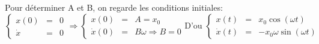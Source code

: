 	Pour déterminer A et B, on regarde les conditions initiales:
	\[\left\{\begin{array}{rcl}
				x(0) &=& 0 \\
				\dot{x} &=& 0
		\end{array}\right.
	\Rightarrow 
	\left\{\begin{array}{rcl}
		x(0) &=& A = x_0 \\
		\dot{x}(0) &=& B\omega \Rightarrow B=0\end{array}\right.
			\text{D'ou } \left\{
			\begin{array}{rcl}
			x(t) &=& x_0\cos(\omega t) \\
		\dot{x}(t) &=& -x_0\omega\sin(\omega t) \end{array}\right.\]
